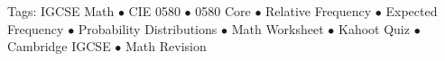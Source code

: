 \documentclass[11pt,a4paper]{article}
\begin{document}
\vspace{14pt}
\begin{center}
  \sffamily\scriptsize\textcolor{textmuted}{
    Tags: IGCSE Math $\bullet$ CIE 0580 $\bullet$ 0580 Core $\bullet$ Relative Frequency $\bullet$ Expected Frequency $\bullet$ Probability Distributions $\bullet$ Math Worksheet $\bullet$ Kahoot Quiz $\bullet$ Cambridge IGCSE $\bullet$ Math Revision
  }
\end{center}
\end{document}
